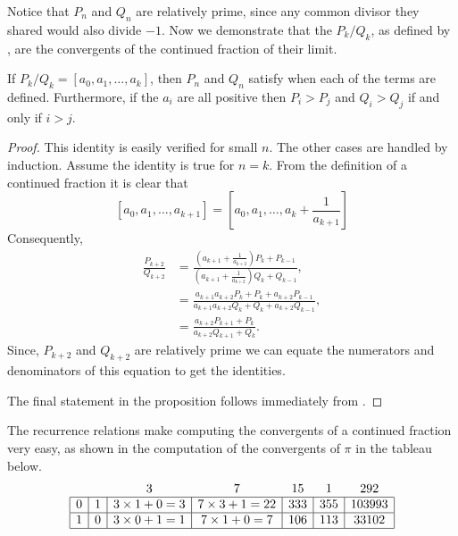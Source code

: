 Notice that $P_n$ and $Q_n$ are relatively prime, since any common
divisor they shared would also divide $-1$.  Now we demonstrate that the
$P_k/Q_k$, as defined by , are the convergents
of the continued fraction of their limit.

\begin{proposition}\label{CF:Recurrence:Prop}
If $P_k/Q_k = [a_0, a_1, \ldots, a_k]$, then $P_n$ and $Q_n$ satisfy
 when each of the terms are defined.
Furthermore, if the $a_i$ are all positive then $P_i > P_j$ and $Q_i >
Q_j$ if and only if $i > j$.
\end{proposition}

\begin{proof}
This identity is easily verified for small $n$.  The other cases are
handled by induction.  Assume the identity is true for $n=k$.  From
the definition of a continued fraction it is clear that
\[
[a_0, a_1, \ldots, a_{k+1}] =
[a_0, a_1, \ldots, a_k + \frac{1}{a_{k+1}}]
\]
Consequently,
\[
\begin{aligned}
  \frac{P_{k+2}}{Q_{k+2}} &=
      \frac{\left(\displaystyle a_{k+1} + \frac{1}{a_{k+2}}\right) P_{k} + P_{k-1}}{\left(\displaystyle a_{k+1} + \frac{1}{a_{k+2}}\right) Q_{k} + Q_{k-1}},\\
    & = \frac{a_{k+1} a_{k+2} P_k + P_k + a_{k+2} P_{k-1}}{
              a_{k+1} a_{k+2} Q_k + Q_k + a_{k+2} Q_{k-1} },\\
    & = \frac{a_{k+2} P_{k+1} + P_k}{a_{k+2} Q_{k+1} + Q_k}.
\end{aligned}
\]
Since, $P_{k+2}$ and $Q_{k+2}$ are relatively prime we can equate the
numerators and denominators of this equation to get the identities.

The final statement in the proposition follows immediately from
.  
\end{proof}

The recurrence relations  make computing the
convergents of a continued fraction very easy, as shown in the
computation of the convergents of $\pi$ in the tableau below.
\[
\begin{array}{|c|c|c|c|c|c|c|}
\multicolumn{1}{c}{} & \multicolumn{1}{c}{} & 
\multicolumn{1}{c}{3} & \multicolumn{1}{c}{7} & 
\multicolumn{1}{c}{15} & \multicolumn{1}{c}{1} &
\multicolumn{1}{c}{292} \\ \hline
0 & 1 & 3 \times 1 +0 = 3 & 7 \times 3 +1 = 22 &
 333 & 355 & 103993\\ \hline
1 & 0 & 3 \times 0 +1 = 1 & 7 \times 1 + 0 = 7 &
 106 & 113 & 33102\\ \hline
\end{array}
\]

